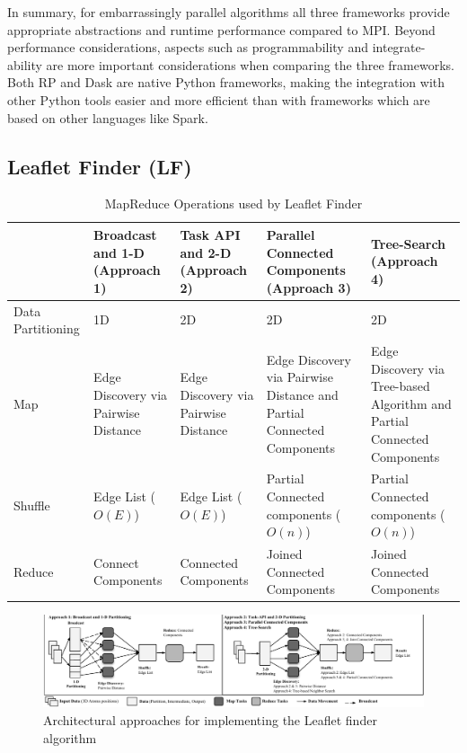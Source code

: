 In summary, for embarrassingly parallel algorithms all three frameworks provide
appropriate abstractions and runtime performance compared to MPI. Beyond
performance considerations, aspects such as programmability and
integrate-ability are more important considerations when comparing the three
frameworks. Both RP and Dask are native Python frameworks, making the
integration with other Python tools easier and more efficient than with
frameworks which are based on other languages like Spark.

\subsection{Leaflet Finder (LF)}
\label{sec:leaflet}

\begin{table}[t]
    \scriptsize
    \centering
    \begin{tabular}{@{}p{2cm}|p{2.8cm}p{2.8cm}p{2.8cm}p{2.8cm}@{}}
        \toprule
        &
        \textbf{Broadcast and 1-D} (Approach 1) &
        \textbf{Task API and 2-D} (Approach 2) &
        \textbf{Parallel Connected Components} (Approach 3) &
        \textbf{Tree-Search} (Approach 4)\\
        \midrule
        Data Partitioning  &
        1D  &
        2D &
        2D &
        2D\\
        Map &
        Edge Discovery via Pairwise Distance &
        Edge Discovery via Pairwise Distance &
        Edge Discovery via Pairwise Distance and Partial Connected Components &
        Edge Discovery via Tree-based Algorithm and Partial Connected Components\\
        Shuffle &
        Edge List ($O(E)$) &
        Edge List ($O(E)$) &
        Partial Connected components ($O(n)$) &
        Partial Connected components ($O(n)$)\\
        Reduce   &
        Connect Components  &
        Connected Components &
        Joined Connected Components &
        Joined Connected Components\\
        \bottomrule
    \end{tabular}
    \caption{MapReduce Operations used by Leaflet Finder\label{tab:app_operators}}
\end{table}

\begin{figure}[t]
    \centering
    \includegraphics[width=.95\textwidth]{figures/data_analytics_hpc/task_par/lf_approaches.pdf}
    \caption{Architectural approaches for implementing the Leaflet finder algorithm\label{fig:lf_approaches}}
\end{figure}


